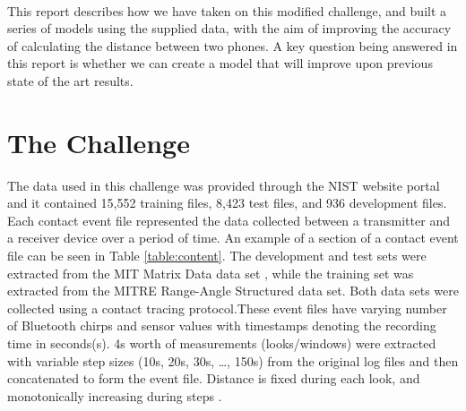 \documentclass[conference]{IEEEtran}
\begin{document}
\begin{table} [!h]
\centering
{} \vspace{0.25cm}
    \caption{Previous state of the art results}
\label{table:summary}
\end{table}\\
This report describes how we have taken on this modified challenge, and built a series of models using the supplied data, with the aim of improving the accuracy of calculating the distance between two phones. A key question being answered in this report is whether we can create a model that will improve upon previous state of the art results.
\section{The Challenge}

The data used in this challenge was provided through the NIST website portal \cite{b5} and it contained 15,552 training files, 8,423 test files, and 936 development files. Each contact event file represented the data collected between a transmitter and a receiver device over a  period of time. An example of a section of a contact event file can be seen in Table \ref{table:content}. The development and test sets were extracted from the MIT Matrix Data data set \cite{b6}, while the training set was extracted from the MITRE Range-Angle Structured data set\cite{b7}. Both data sets were collected using a contact tracing protocol\cite{b8}.These event files have varying number of Bluetooth chirps and sensor values with timestamps denoting the recording time in seconds(s). 4s worth of measurements (looks/windows) were extracted  with variable step sizes (10s, 20s, 30s, …, 150s) from the original log files and then concatenated to form the event file. Distance is fixed during each look, and monotonically increasing during steps \cite{b9}. 
\end{document}
